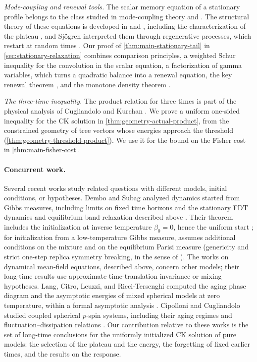 \emph{Mode-coupling and renewal tools.} The scalar memory equation of a stationary profile belongs to the class studied in mode-coupling theory \cite[Sections~3.1--3.2]{goetzesjogren1992} and \cite[Section~4.2.1, Equations~(4.15)--(4.17), pp.~192--193]{goetze2009}. The structural theory of these equations is developed in \cite{gs1995} and \cite{fv2002}, including the characterization of the plateau \cite[arXiv version~1, Section~IV]{fv2002}, and Sj\"ogren interpreted them through regenerative processes, which restart at random times \cite{sjogren2003}. Our proof of \cref{thm:main-stationary-tail} in \cref{sec:stationary-relaxation} combines comparison principles, a weighted Schur inequality for the convolution in the scalar equation, a factorization of gamma variables, which turns a quadratic balance into a renewal equation, the key renewal theorem \cite{feller1971}, and the monotone density theorem \cite[Section~1.7.3]{bgt1987}.

\emph{The three-time inequality.} The product relation for three times is part of the physical analysis of Cugliandolo and Kurchan \cite[arXiv version~1, Section~5.1, Equation~(5.1.8)]{ck1994}. We prove a uniform one-sided inequality for the CK solution in \cref{thm:geometry-actual-product}, from the constrained geometry of tree vectors whose energies approach the threshold (\cref{thm:geometry-threshold-product}). We use it for the bound on the Fisher cost in \cref{thm:main-fisher-cost}.

\paragraph{Concurrent work.}
Several recent works study related questions with different models, initial conditions, or hypotheses. Dembo and Subag analyzed dynamics started from Gibbs measures, including limits on fixed time horizons and the stationary FDT dynamics and equilibrium band relaxation described above \cite{ds2025}. Their theorem includes the initialization at inverse temperature $\beta_0=0$, hence the uniform start \cite[Theorem~1.8(a) and Proposition~1.10]{ds2025}; for initialization from a low-temperature Gibbs measure, \cite[Theorem~1.8(b)]{ds2025} assumes additional conditions on the mixture and on the equilibrium Parisi measure (genericity and strict one-step replica symmetry breaking, in the sense of \cite[Section~1]{ds2025}). The works \cite{fan2025a,fan2025b,fan2026} on dynamical mean-field equations, described above, concern other models; their long-time results use approximate time-translation invariance or mixing hypotheses. Lang, Citro, Leuzzi, and Ricci-Tersenghi computed the aging phase diagram and the asymptotic energies of mixed spherical models at zero temperature, within a formal asymptotic analysis \cite{lang2026}. Cipolloni and Cugliandolo studied coupled spherical $p$-spin systems, including their aging regimes and fluctuation--dissipation relations \cite{cipolloni2026}. Our contribution relative to these works is the set of long-time conclusions for the uniformly initialized CK solution of pure models: the selection of the plateau and the energy, the forgetting of fixed earlier times, and the results on the response.

